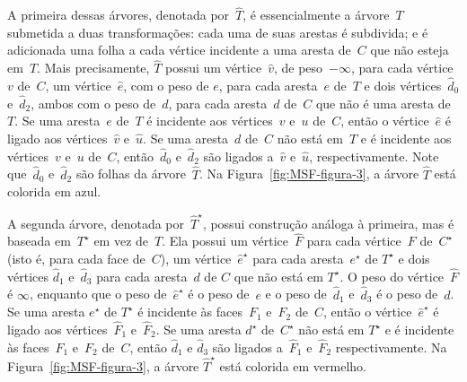 A primeira dessas árvores, denotada por~$\hat T$, é essencialmente a árvore~$T$ submetida a duas transformações:
cada uma de suas arestas é subdivida; e é adicionada uma folha a cada vértice incidente a uma aresta de~$C$ que não esteja em~$T$.
Mais precisamente, $\hat T$ possui um vértice~$\hat v$, de peso~$-\infty$, para cada vértice~$v$ de~$C$, um vértice~$\hat e$, com o peso de $e$, para cada aresta~$e$ de~$T$ e dois vértices~$\hat d_0$ e~$\hat d_2$, ambos com o peso de~$d$, para cada aresta~$d$ de~$C$ que não é uma aresta de~$T$.
Se uma aresta~$e$ de~$T$ é incidente aos vértices~$v$ e~$u$ de~$C$, então o vértice~$\hat e$ é ligado aos vértices~$\hat v$ e~$\hat u$.
Se uma aresta~$d$ de~$C$ não está em~$T$ e é incidente aos vértices~$v$ e~$u$ de~$C$, então~$\hat d_0$ e~$\hat d_2$ são ligados a~$\hat v$ e~$\hat u$, respectivamente.
Note que~$\hat d_0$ e~$\hat d_2$ são folhas da árvore~$\hat T$.
Na Figura~\ref{fig:MSF-figura-3}, a árvore $\hat T$ está colorida em azul.

A segunda árvore, denotada por~$\hat T^\star$, possui construção análoga à primeira, mas é baseada em~$T^\star$ em vez de~$T$.
Ela possui um vértice~$\hat F$ para cada vértice~$F$ de~$C^\star$ (isto é, para cada face de~$C$), um vértice~$\hat e^\star$ para cada aresta~$e^\star$ de $T^\star$ e dois vértices $\hat d_1$ e~$\hat d_3$ para cada aresta~$d$ de $C$ que não está em $T^\star$.
O peso do vértice~$\hat F$ é $\infty$, enquanto que o peso de~$\hat e^\star$ é o peso de~$e$ e o peso de~$\hat d_1$ e~$\hat d_3$ é o peso de~$d$.
Se uma aresta $e^\star$ de $T^\star$ é incidente às faces~$F_1$ e~$F_2$ de~$C$, então o vértice~$\hat e^\star$ é ligado aos vértices~$\hat F_1$ e~$\hat F_2$.
Se uma aresta $d^\star$ de~$C^\star$ não está em $T^\star$ e é incidente às faces~$F_1$ e~$F_2$ de~$C$, então $\hat d_1$ e $\hat d_3$ são ligados a~$\hat F_1$ e~$\hat F_2$ respectivamente.
Na Figura~\ref{fig:MSF-figura-3}, a árvore $\hat T^\star$ está colorida em vermelho.

